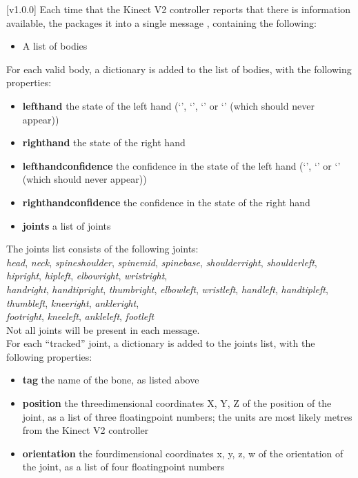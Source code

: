 [v1.0.0]
Each time that the Kinect V2 controller reports that there is information available,
the  packages it into a single message
\openSq{}\closeSq, containing the following:
\begin{itemize}
\item A list of bodies
\end{itemize}

For each valid body, a dictionary \openSq{}\closeSq{} is added to the list
of bodies, with the following properties:
\begin{itemize}
\item\textbf{lefthand} \longDash{} the state of the left hand (`',
`', `' or `' (which should never appear))
\item\exSp\textbf{righthand} \longDash{} the state of the right hand
\item\exSp\textbf{lefthandconfidence} \longDash{} the confidence in the state of the left
hand (`', `' or `' (which should never appear))
\item\exSp\textbf{righthandconfidence} \longDash{} the confidence in the state of the
right hand
\item\exSp\textbf{joints} \longDash{} a list of joints
\end{itemize}

The joints list consists of the following joints:\\
\textbraceleft{} \emph{head}, \emph{neck}, \emph{spineshoulder}, \emph{spinemid},
\emph{spinebase}, \emph{shoulderright}, \emph{shoulderleft}, \emph{hipright},
\emph{hipleft}, \emph{elbowright}, \emph{wristright},\\
\emph{handright}, \emph{handtipright}, \emph{thumbright}, \emph{elbowleft},
\emph{wristleft}, \emph{handleft}, \emph{handtipleft}, \emph{thumbleft}, \emph{kneeright},
\emph{ankleright},\\
\emph{footright}, \emph{kneeleft}, \emph{ankleleft}, \emph{footleft} \textbraceright\\

Not all joints will be present in each message.\\

For each ``tracked'' joint, a dictionary is added to the joints list, with the following
properties:
\begin{itemize}
\item\textbf{tag} \longDash{} the name of the bone, as listed above
\item\exSp\textbf{position} \longDash{} the three\longDash{}dimensional coordinates
\openSq{}X, Y, Z\closeSq{} of the position of the joint, as a list of three
floating\longDash{}point numbers; the units are most likely metres from the Kinect V2
controller
\item\exSp\textbf{orientation} \longDash{} the four\longDash{}dimensional coordinates
\openSq{}x, y, z, w\closeSq{} of the orientation of the joint, as a list of four
floating\longDash{}point numbers
\end{itemize}
\appendixEnd{}
